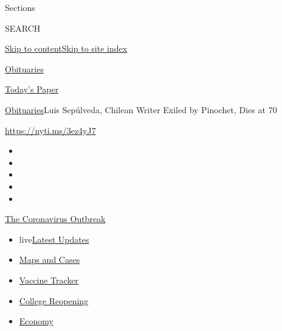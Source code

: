 Sections

SEARCH

\protect\hyperlink{site-content}{Skip to
content}\protect\hyperlink{site-index}{Skip to site index}

\href{https://www.nytimes3xbfgragh.onion/section/obituaries}{Obituaries}

\href{https://myaccount.nytimes3xbfgragh.onion/auth/login?response_type=cookie\&client_id=vi}{}

\href{https://www.nytimes3xbfgragh.onion/section/todayspaper}{Today's
Paper}

\href{/section/obituaries}{Obituaries}\textbar{}Luis Sepúlveda, Chilean
Writer Exiled by Pinochet, Dies at 70

\url{https://nyti.ms/3ez4yJ7}

\begin{itemize}
\item
\item
\item
\item
\item
\end{itemize}

\href{https://www.nytimes3xbfgragh.onion/news-event/coronavirus?action=click\&pgtype=Article\&state=default\&region=TOP_BANNER\&context=storylines_menu}{The
Coronavirus Outbreak}

\begin{itemize}
\tightlist
\item
  live\href{https://www.nytimes3xbfgragh.onion/2020/08/04/world/coronavirus-covid-19.html?action=click\&pgtype=Article\&state=default\&region=TOP_BANNER\&context=storylines_menu}{Latest
  Updates}
\item
  \href{https://www.nytimes3xbfgragh.onion/interactive/2020/us/coronavirus-us-cases.html?action=click\&pgtype=Article\&state=default\&region=TOP_BANNER\&context=storylines_menu}{Maps
  and Cases}
\item
  \href{https://www.nytimes3xbfgragh.onion/interactive/2020/science/coronavirus-vaccine-tracker.html?action=click\&pgtype=Article\&state=default\&region=TOP_BANNER\&context=storylines_menu}{Vaccine
  Tracker}
\item
  \href{https://www.nytimes3xbfgragh.onion/2020/08/02/us/covid-college-reopening.html?action=click\&pgtype=Article\&state=default\&region=TOP_BANNER\&context=storylines_menu}{College
  Reopening}
\item
  \href{https://www.nytimes3xbfgragh.onion/live/2020/08/03/business/stock-market-today-coronavirus?action=click\&pgtype=Article\&state=default\&region=TOP_BANNER\&context=storylines_menu}{Economy}
\end{itemize}

